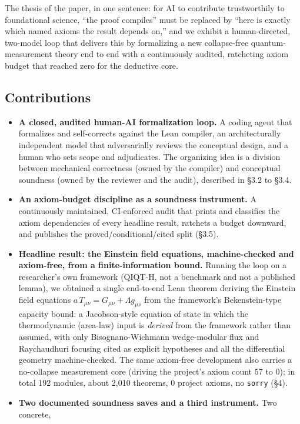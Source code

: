 \documentclass[11pt]{article}
\begin{document}
The thesis of the paper, in one sentence: for AI to contribute trustworthily to foundational
science, ``the proof compiles'' must be replaced by ``here is exactly which named axioms the result
depends on,'' and we exhibit a human-directed, two-model loop that delivers this by formalizing a
new collapse-free quantum-measurement theory end to end with a continuously audited, ratcheting
axiom budget that reached zero for the deductive core.

\subsection{Contributions}

\begin{itemize}
\item \textbf{A closed, audited human-AI formalization loop.} A coding agent that formalizes and
  self-corrects against the Lean compiler, an architecturally independent model that adversarially
  reviews the conceptual design, and a human who sets scope and adjudicates. The organizing idea is
  a division between mechanical correctness (owned by the compiler) and conceptual soundness (owned
  by the reviewer and the audit), described in \S3.2 to \S3.4.
\item \textbf{An axiom-budget discipline as a soundness instrument.} A continuously maintained,
  CI-enforced audit that prints and classifies the axiom dependencies of every headline result,
  ratchets a budget downward, and publishes the proved/conditional/cited split (\S3.5).
\item \textbf{Headline result: the Einstein field equations, machine-checked and axiom-free, from a
  finite-information bound.} Running the loop on a researcher's own framework (QIQT-H, not a
  benchmark and not a published lemma), we obtained a single end-to-end Lean theorem deriving the
  Einstein field equations $a\,T_{\mu\nu}=G_{\mu\nu}+\Lambda g_{\mu\nu}$ from the framework's
  Bekenstein-type capacity bound: a Jacobson-style equation of state in which the thermodynamic
  (area-law) input is \emph{derived} from the framework rather than assumed, with only
  Bisognano-Wichmann wedge-modular flux and Raychaudhuri focusing cited as explicit hypotheses and
  all the differential geometry machine-checked. The same axiom-free development also carries a
  no-collapse measurement core (driving the project's axiom count 57 to 0); in total 192 modules,
  about 2{,}010 theorems, 0 project axioms, no \texttt{sorry} (\S4).
\item \textbf{Two documented soundness saves and a third instrument.} Two concrete,

\end{itemize}
\end{document}
